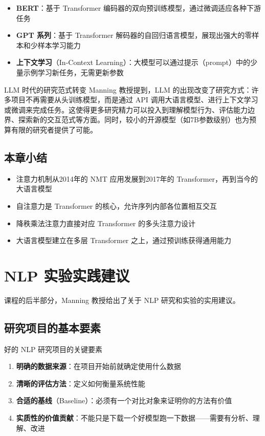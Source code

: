 \documentclass[a4paper]{article}
\begin{document}
\begin{itemize}
    \item \textbf{BERT}：基于 Transformer 编码器的双向预训练模型，通过微调适应各种下游任务
    \item \textbf{GPT 系列}：基于 Transformer 解码器的自回归语言模型，展现出强大的零样本和少样本学习能力
    \item \textbf{上下文学习}（In-Context Learning）：大模型可以通过提示（prompt）中的少量示例学习新任务，无需更新参数
\end{itemize}

\begin{knowledgebox}{LLM 时代的研究范式转变}
Manning 教授提到，LLM 的出现改变了研究方式：许多项目不再需要从头训练模型，而是通过 API 调用大语言模型、进行上下文学习或微调来完成任务。这使得更多研究精力可以投入到理解模型行为、评估能力边界、探索新的交互范式等方面。同时，较小的开源模型（如7B参数级别）也为预算有限的研究者提供了可能。
\end{knowledgebox}

\subsection{本章小结}

\begin{itemize}
    \item 注意力机制从2014年的 NMT 应用发展到2017年的 Transformer，再到当今的大语言模型
    \item 自注意力是 Transformer 的核心，允许序列内部各位置相互交互
    \item 降秩乘法注意力直接对应 Transformer 的多头注意力设计
    \item 大语言模型建立在多层 Transformer 之上，通过预训练获得通用能力
\end{itemize}


\section{NLP 实验实践建议}

课程的后半部分，Manning 教授给出了关于 NLP 研究和实验的实用建议。

\subsection{研究项目的基本要素}

\begin{importantbox}{好的 NLP 研究项目的关键要素}
\begin{enumerate}
    \item \textbf{明确的数据来源}：在项目开始前就确定使用什么数据
    \item \textbf{清晰的评估方法}：定义如何衡量系统性能
    \item \textbf{合适的基线}（Baseline）：必须有一个对比对象来证明你的方法有价值
    \item \textbf{实质性的价值贡献}：不能只是下载一个好模型跑一下数据——需要有分析、理解、改进
\end{enumerate}
\end{importantbox}
\end{document}
